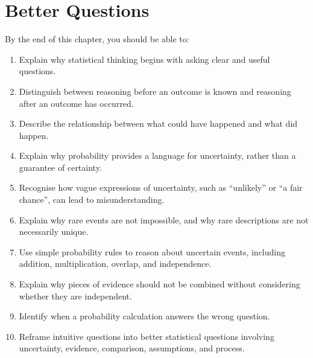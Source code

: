 \documentclass[
  letterpaper,
  DIV=11,
  numbers=noendperiod]{scrreprt}
\providecommand{\tightlist}{%
  \setlength{\itemsep}{0pt}\setlength{\parskip}{0pt}}
\begin{document}

\chapter{Better Questions}\label{better-questions}

\begin{tcolorbox}[enhanced jigsaw, arc=.35mm, bottomrule=.15mm, bottomtitle=1mm, breakable, colback=white, colbacktitle=quarto-callout-note-color!10!white, colframe=quarto-callout-note-color-frame, coltitle=black, left=2mm, leftrule=.75mm, opacityback=0, opacitybacktitle=0.6, rightrule=.15mm, title=\textcolor{quarto-callout-note-color}{\faInfo}\hspace{0.5em}{Learning Objectives}, titlerule=0mm, toprule=.15mm, toptitle=1mm]

By the end of this chapter, you should be able to:

\begin{enumerate}
\def\labelenumi{\arabic{enumi}.}
\tightlist
\item
  Explain why statistical thinking begins with asking clear and useful
  questions.
\item
  Distinguish between reasoning before an outcome is known and reasoning
  after an outcome has occurred.
\item
  Describe the relationship between what could have happened and what
  did happen.
\item
  Explain why probability provides a language for uncertainty, rather
  than a guarantee of certainty.
\item
  Recognise how vague expressions of uncertainty, such as ``unlikely''
  or ``a fair chance'', can lead to misunderstanding.
\item
  Explain why rare events are not impossible, and why rare descriptions
  are not necessarily unique.
\item
  Use simple probability rules to reason about uncertain events,
  including addition, multiplication, overlap, and independence.
\item
  Explain why pieces of evidence should not be combined without
  considering whether they are independent.
\item
  Identify when a probability calculation answers the wrong question.
\item
  Reframe intuitive questions into better statistical questions
  involving uncertainty, evidence, comparison, assumptions, and process.
\end{enumerate}

\end{tcolorbox}
\end{document}
